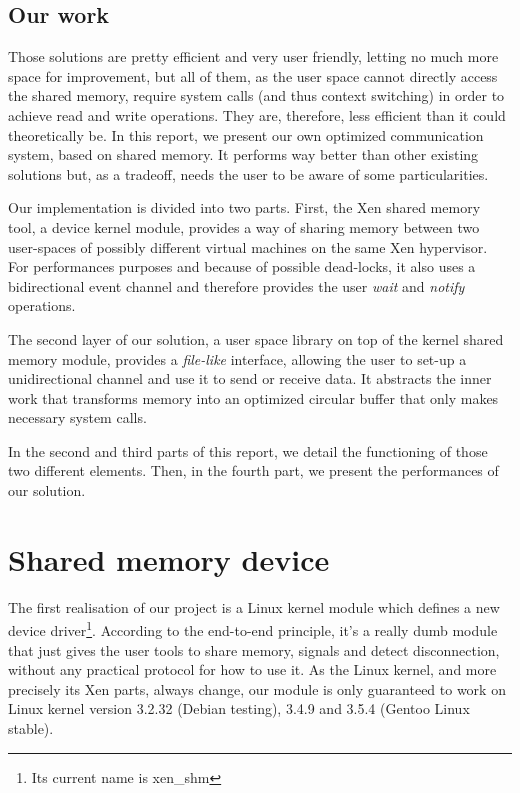 \documentclass[journal]{IEEEtran}
\begin{document}
\subsection{Our work}

Those solutions are pretty efficient and very user friendly, letting no much more space for improvement, but all of them, as the user space cannot directly access the shared memory, require system calls (and thus context switching) in order to achieve read and write operations.
They are, therefore, less efficient than it could theoretically be. 
In this report, we present our own optimized communication system, based on shared memory. It performs way better than other existing solutions but, as a tradeoff, needs the user to be aware of some particularities.



Our implementation is divided into two parts. First, the Xen shared memory tool, a device kernel module, provides a way of sharing memory between two user-spaces of possibly different virtual machines on the same Xen hypervisor. For performances purposes and because of possible dead-locks, it also uses a bidirectional event channel and therefore provides the user \emph{wait} and \emph{notify} operations.

The second layer of our solution, a user space library on top of the kernel shared memory module, provides a \emph{file-like} interface, allowing the user to set-up a unidirectional channel and use it to send or receive data. It abstracts the inner work that transforms memory into an optimized circular buffer that only makes necessary system calls.

In the second and third parts of this report, we detail the functioning of those two different elements. Then, in the fourth part, we present the performances of our solution. 




\section{Shared memory device}

The first realisation of our project is a Linux kernel module which defines a new device driver\footnote{Its current name is xen\_shm}.
According to the end-to-end principle, it's a really dumb module that just gives the user tools to share memory, signals and detect disconnection, without any practical protocol for how to use it.
As the Linux kernel, and more precisely its Xen parts, always change, our module is only guaranteed to work on Linux kernel version 3.2.32 (Debian testing), 3.4.9 and 3.5.4 (Gentoo Linux stable).
\end{document}
